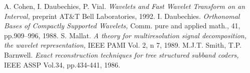 \begin{thebibliography}{Dau1}

 A. Cohen, I. Daubechies, P. Vial. 
{\em Wavelets and Fast Wavelet Transform on an Interval, } 
preprint AT\&T Bell Laboratories, 1992.
 I. Daubechies. 
{\em Orthonomal Bases of Compactly Supported Wavelets, } 
Comm. pure and applied math., 41, pp.909--996, 1988.
 S. Mallat. {\em A theory for multiresolution signal decomposition, the wavelet representation, } IEEE PAMI Vol. 2, n 7, 1989.
 M.J.T. Smith, T.P. Barnwell. {\em Exact reconstruction techniques for tree structured subband coders, } IEEE ASSP Vol.34, pp.434-441, 1986.

\end{thebibliography}

